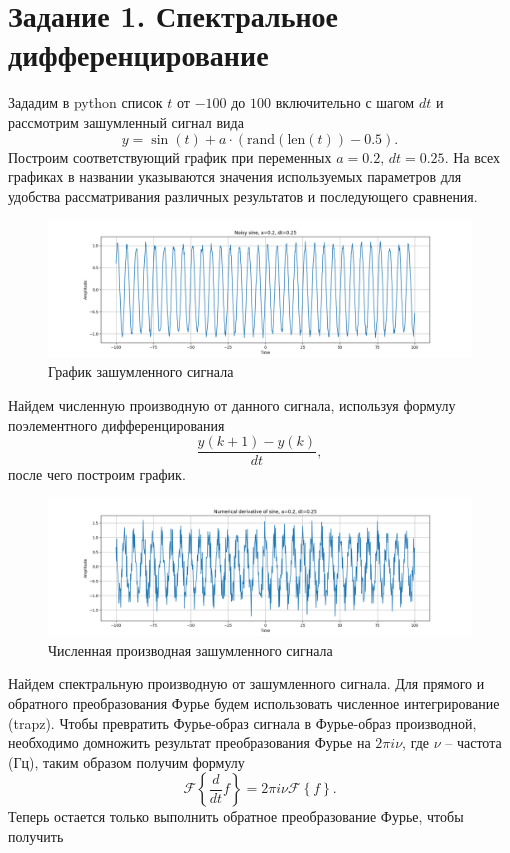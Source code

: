 \documentclass[a4paper, 12pt]{article}
\begin{document}
    \section{Задание 1. Спектральное дифференцирование}
    Зададим в python список $t$ от $-100$ до $100$ включительно с шагом $dt$ и рассмотрим зашумленный сигнал вида $$y=\sin{(t)}+a\cdot(\text{rand}(\text{len}(t))-0.5).$$
    Построим соответствующий график при переменных $a=0.2,\,dt=0.25$. На всех графиках в названии указываются значения используемых параметров для удобства рассматривания
    различных результатов и последующего сравнения.
    \begin{figure}[H]
        \centering
        \includegraphics[scale=0.4]{1_noisy_sine.png}
        \captionsetup{skip=0pt}
        \caption{График зашумленного сигнала}
        \label{fig:1ns}
    \end{figure}
    Найдем численную производную от данного сигнала, используя формулу поэлементного дифференцирования $$\dfrac{y(k+1)-y(k)}{dt},$$ после чего построим график.
    \begin{figure}[H]
        \centering
        \includegraphics[scale=0.4]{1_numdiff_sine.png}
        \captionsetup{skip=0pt}
        \caption{Численная производная зашумленного сигнала}
        \label{fig:1nds}
    \end{figure}
    Найдем спектральную производную от зашумленного сигнала. Для прямого и обратного преобразования Фурье будем использовать численное интегрирование (trapz). Чтобы
    превратить Фурье-образ сигнала в Фурье-образ производной, необходимо домножить результат преобразования Фурье на $2\pi i \nu$, где $\nu$ -- частота (Гц),
    таким образом получим формулу $$\mathcal{F}\left\{\frac{d}{dt}f\right\}=2\pi i \nu \mathcal{F}\left\{f\right\}.$$ Теперь остается только выполнить обратное преобразование Фурье, чтобы получить
\end{document}
